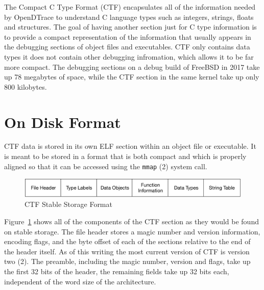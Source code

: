 The Compact C Type Format (CTF) encapsulates all of the information
needed by OpenDTrace to understand C language types such as integers,
strings, floats and structures.  The goal of having another section
just for C type information is to provide a compact representation of
the information that usually appears in the debugging sections of
object files and executables.  CTF only contains data types it
does not contain other debugging infromation, which allows it to be
far more compact.  The debugging sections on a debug build of FreeBSD
in 2017 take up 78 megabytes of space, while the CTF section in the
same kernel take up only 800 kilobytes. 

\section{On Disk Format}
\label{sec:ctf-on-disk-format}

CTF data is stored in its own ELF section within an object file or
executable.  It is meant to be stored in a format that is both compact
and which is properly aligned so that it can be accessed using the
\texttt{mmap} (2) system call.

\begin{figure}[h]
  \centering
  \includegraphics[width=.8\textwidth]{ctf-stable-format}
  \caption{CTF Stable Storage Format}
  \label{fig:ctf-stable-storage-format}
\end{figure}

Figure~\ref{fig:ctf-stable-storage-format} shows all of the components
of the CTF section as they would be found on stable storage.  The file
header stores a magic number and version information, encoding flags,
and the byte offset of each of the sections relative to the end of the
header itself.  As of this writing the most current version of CTF is
version two (2).  The preamble, including the magic number, version
and flags, take up the first 32 bits of the header, the remaining
fields take up 32 bits each, independent of the word size of the
architecture.

